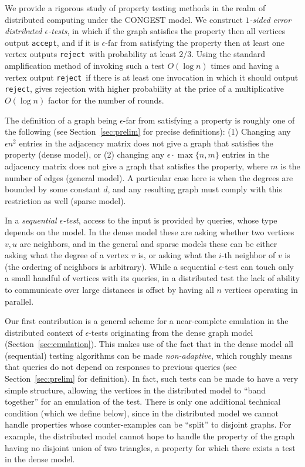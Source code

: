 \documentclass[11pt]{article}
\newcommand{\accept}{\texttt{accept}}
\newcommand{\reject}{\texttt{reject}}
\begin{document}
We provide a rigorous study of property testing methods in the realm of distributed computing under the CONGEST model.
We construct \emph{$1$-sided error distributed $\epsilon$-tests}, in which if the graph satisfies the property then all vertices output \accept, and if it is $\epsilon$-far from satisfying the property then at least one vertex outputs \reject ~with probability at least $2/3$.
Using the standard amplification method of invoking such a test $O(\log{n})$ times and having a vertex output \reject~if there is at least one invocation in which it should output \reject, gives rejection with higher probability at the price of a multiplicative $O(\log{n})$ factor for the number of rounds.

The definition of a graph being $\epsilon$-far from satisfying a property is roughly one of the following (see Section~\ref{sec:prelim} for precise definitions): (1) Changing any $\epsilon n^2$ entries in the adjacency matrix does not give a graph that satisfies the property (dense model), or (2) changing any $\epsilon \cdot\max\{n,m\}$ entries in the adjacency matrix does not give a graph that satisfies the property, where $m$ is the number of edges (general model). A particular case here is when the degrees are bounded by some constant $d$, and any resulting graph must comply with this restriction as well (sparse model).



In a \emph{sequential $\epsilon$-test}, access to the input is provided by queries, whose type depends on the model. In the dense model these are asking whether two vertices $v,u$ are neighbors, and in the general and sparse models these can be either asking what the degree of a vertex $v$ is, or asking what the $i$-th neighbor of $v$ is (the ordering of neighbors is arbitrary). While a sequential $\epsilon$-test can touch only a small handful of vertices with its queries, in a distributed test the lack of ability to communicate over large distances is offset by having all $n$ vertices operating in parallel.



Our first contribution is a general scheme for a near-complete emulation in the distributed context of $\epsilon$-tests originating from the dense graph model (Section~\ref{sec:emulation}). This makes use of the fact that in the dense model all (sequential) testing algorithms can be made \emph{non-adaptive}, which roughly means that queries do not depend on responses to previous queries (see Section~\ref{sec:prelim} for definition).
In fact, such tests can be made to have a very simple structure, allowing the vertices in the distributed model to ``band together'' for an emulation of the test. There is only one additional technical condition (which we define below), since in the distributed model we cannot handle properties whose counter-examples can be ``split'' to disjoint graphs. For example, the distributed model cannot hope to handle the property of the graph having no disjoint union of two triangles, a property for which there exists a test in the dense model.
\end{document}
